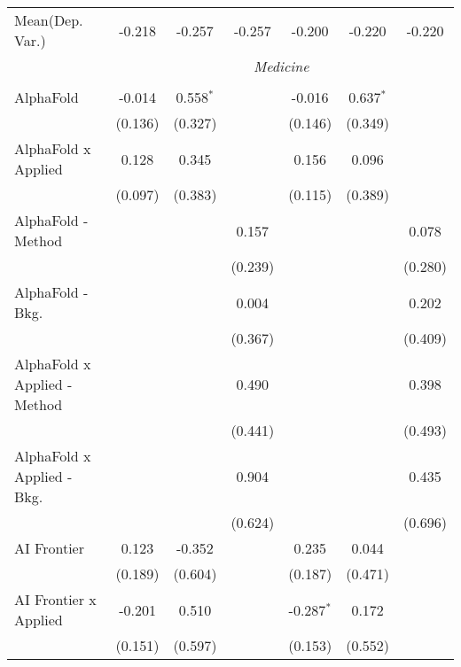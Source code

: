 \begin{tabular}{lcccccc}
Mean(Dep. Var.) & -0.218 & -0.257 & -0.257 & -0.200 & -0.220 & -0.220 \\
 & \multicolumn{6}{c}{\textit{Medicine}} \\ \\
   AlphaFold                      & -0.014  & 0.558$^{*}$ &               & -0.016       & 0.637$^{*}$ &   \\   
                                  & (0.136) & (0.327)     &               & (0.146)      & (0.349)     &   \\   
   AlphaFold x Applied            & 0.128   & 0.345       &               & 0.156        & 0.096       &   \\   
                                  & (0.097) & (0.383)     &               & (0.115)      & (0.389)     &   \\   
   AlphaFold - Method             &         &             & 0.157         &              &             & 0.078\\   
                                  &         &             & (0.239)       &              &             & (0.280)\\   
   AlphaFold - Bkg.               &         &             & 0.004         &              &             & 0.202\\   
                                  &         &             & (0.367)       &              &             & (0.409)\\   
   AlphaFold x Applied - Method   &         &             & 0.490         &              &             & 0.398\\   
                                  &         &             & (0.441)       &              &             & (0.493)\\   
   AlphaFold x Applied - Bkg.     &         &             & 0.904         &              &             & 0.435\\   
                                  &         &             & (0.624)       &              &             & (0.696)\\   
   AI Frontier                    & 0.123   & -0.352      &               & 0.235        & 0.044       &   \\   
                                  & (0.189) & (0.604)     &               & (0.187)      & (0.471)     &   \\   
   AI Frontier x Applied          & -0.201  & 0.510       &               & -0.287$^{*}$ & 0.172       &   \\   
                                  & (0.151) & (0.597)     &               & (0.153)      & (0.552)     &   \\   

\end{tabular}
